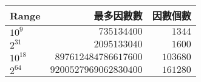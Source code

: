 \begin{tabular}[c]{|l|r|r|}
    \hline
    Range & 最多因數數 & 因數個數 \\
    \hline
    $10^9$ & $735134400$ & $1344$ \\
    $2^{31}$ & $2095133040$ & $1600$ \\
    $10^{18}$ & $897612484786617600$ & $103680$ \\
    $2^{64}$ & $9200527969062830400$ & $161280$ \\
    \hline
\end{tabular}